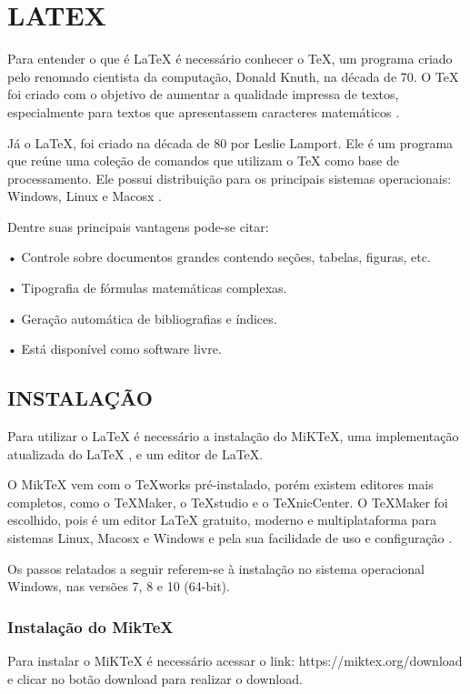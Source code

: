 \newpage
\section{LATEX}
\indent Para entender o que é LaTeX é necessário conhecer o TeX, um programa criado pelo renomado cientista da computação, Donald Knuth, na década de 70. O TeX foi criado com o objetivo de aumentar a qualidade impressa de textos, especialmente para textos que apresentassem caracteres matemáticos \cite{oetiker2001}.

Já o LaTeX, foi criado na década de 80 por Leslie Lamport. Ele é um programa que reúne uma coleção de comandos que utilizam o TeX como base de processamento. Ele possui distribuição para os principais sistemas operacionais: Windows, Linux e Macosx \cite{oetiker2001}.

Dentre suas principais vantagens pode-se citar:

•	Controle sobre documentos grandes contendo seções, tabelas, figuras, etc.

•	Tipografia de fórmulas matemáticas complexas.

•	Geração automática de bibliografias e índices.

•	Está disponível como software livre.\\

\subsection{INSTALAÇÃO}
Para utilizar o LaTeX é necessário a instalação do MiKTeX, uma implementação atualizada do LaTeX \cite{miktex2018}, e um editor de LaTeX.

O MikTeX vem com o TeXworks pré-instalado, porém existem editores mais completos, como o TeXMaker, o TeXstudio e o TeXnicCenter. O TeXMaker foi escolhido, pois é um editor LaTeX gratuito, moderno e multiplataforma para sistemas Linux, Macosx e Windows e pela sua facilidade de uso e configuração \cite{texmaker2018}.

Os passos relatados a seguir referem-se à instalação no sistema operacional Windows, nas versões 7, 8 e 10 (64-bit).

\newpage
\subsubsection{Instalação do MikTeX}
Para instalar o MiKTeX é necessário acessar o link: https://miktex.org/download e clicar no botão download para realizar o download.

